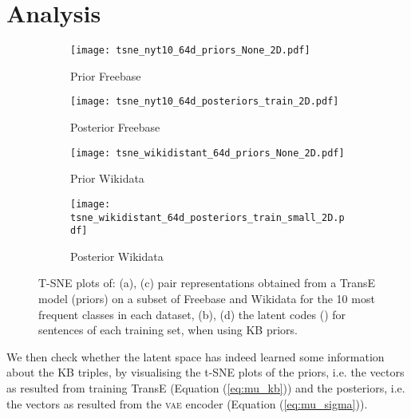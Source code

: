 \documentclass[11pt]{article}
\begin{document}
\section{Analysis}
\begin{figure*}[t!]
    \centering
    \begin{subfigure}[b]{0.25\textwidth}
    \texttt{[image: tsne\_nyt10\_64d\_priors\_None\_2D.pdf]}
    \caption{Prior Freebase}
    \label{fig:prior_fb}
    \end{subfigure}\begin{subfigure}[b]{0.25\textwidth}
    \texttt{[image: tsne\_nyt10\_64d\_posteriors\_train\_2D.pdf]}
    \caption{Posterior Freebase}
    \label{fig:post_fb}
    \end{subfigure}\begin{subfigure}[b]{0.25\textwidth}
    \texttt{[image: tsne\_wikidistant\_64d\_priors\_None\_2D.pdf]}
    \caption{Prior Wikidata}
    \label{fig:prior_wiki}
    \end{subfigure}\begin{subfigure}[b]{0.25\textwidth}
    \texttt{[image: tsne\_wikidistant\_64d\_posteriors\_train\_small\_2D.pdf]}
    \caption{Posterior Wikidata}
    \label{fig:post_wiki}
    \end{subfigure}
    \caption{T-SNE plots of: (a), (c) pair representations obtained from a TransE model (priors) on a subset of Freebase and Wikidata for the 10 most frequent classes in each dataset, (b), (d) the latent codes () for sentences of each training set, when using KB priors.}
\end{figure*}



We then check whether the latent space has indeed learned some information about the KB triples, by visualising the t-SNE plots of the priors, i.e. the  vectors as resulted from training TransE (Equation (\ref{eq:mu_kb})) and the posteriors, i.e. the  vectors as resulted from the \textsc{vae} encoder (Equation (\ref{eq:mu_sigma})).
\end{document}
